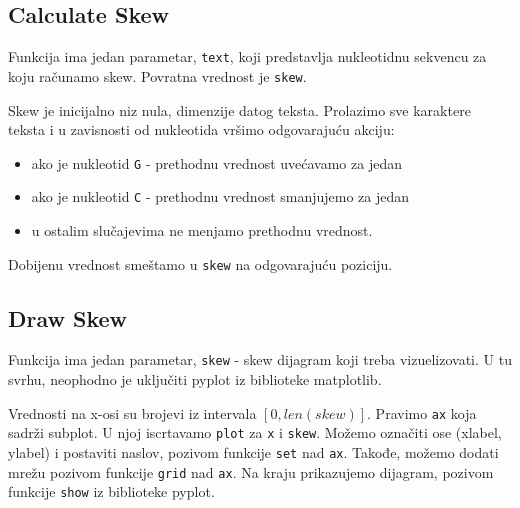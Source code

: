 

\subsection{Calculate Skew}
\label{calculateSkew}

Funkcija ima jedan parametar, \texttt{text}, koji predstavlja nukleotidnu sekvencu za koju računamo skew. Povratna vrednost je \texttt{skew}.

Skew je inicijalno niz nula, dimenzije datog teksta. Prolazimo sve karaktere teksta i u zavisnosti od nukleotida vršimo odgovarajuću akciju:
\begin{itemize}
	\item ako je nukleotid \texttt{G} - prethodnu vrednost uvećavamo za jedan
	\item ako je nukleotid \texttt{C} - prethodnu vrednost smanjujemo za jedan
	\item u ostalim slučajevima ne menjamo prethodnu vrednost.
\end{itemize}

\noindent Dobijenu vrednost smeštamo u \texttt{skew} na odgovarajuću poziciju. 



\subsection{Draw Skew}

Funkcija ima jedan parametar, \texttt{skew} - skew dijagram koji treba vizuelizovati. U tu svrhu, neophodno je uključiti pyplot iz biblioteke matplotlib.

Vrednosti na x-osi su brojevi iz intervala $[0, len(skew)]$. Pravimo \texttt{ax} koja sadrži subplot. U njoj iscrtavamo \texttt{plot} za \texttt{x} i \texttt{skew}. Možemo označiti ose (xlabel, ylabel) i postaviti naslov, pozivom funkcije \texttt{set} nad \texttt{ax}. Takođe, možemo dodati mrežu pozivom funkcije \texttt{grid} nad \texttt{ax}. Na kraju prikazujemo dijagram, pozivom funkcije \texttt{show} iz biblioteke pyplot.











